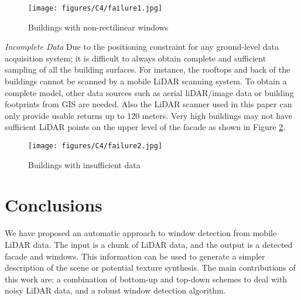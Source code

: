 \begin{figure}[H]
\centering
\texttt{[image: figures/C4/failure1.jpg]} \\
\caption{Buildings with non-rectilinear windows} 
\label{fig:C4:failure1}
\end{figure}

{\it Incomplete Data} Due to the positioning constraint for any ground-level data acquisition system; it is difficult to always obtain complete and sufficient sampling of all the building surfaces. For instance, the rooftops and back of the buildings cannot be scanned by a mobile LiDAR scanning system. To obtain a complete model, other data sources such as aerial liDAR/image data or building footprints from GIS are needed. Also the LiDAR scanner used in this paper can only provide usable returns up to 120 meters. Very high buildings may not have sufficient LiDAR points on the upper level of the facade as shown in Figure \ref{fig:C4:failure2}.

\begin{figure}[H]
\centering
\texttt{[image: figures/C4/failure2.jpg]} \\
\caption{Buildings with insufficient data} 
\label{fig:C4:failure2}
\end{figure}


\section{Conclusions}  

We have proposed an automatic approach to window detection from mobile LiDAR data. The input is a chunk of LiDAR data, and the output is a detected facade and windows. This information can be used to generate a simpler description of the scene or potential texture synthesis. The main contributions of this work are: a combination of bottom-up and top-down schemes to deal with noisy LiDAR data, and a robust window detection algorithm.




